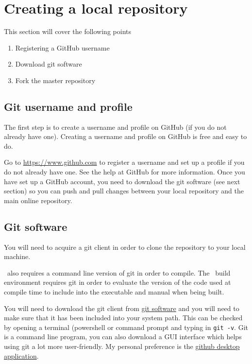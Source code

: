 \section{Creating a local repository\label{sec:local_repo}}

This section will cover the following points

\begin{enumerate}
	\item Registering a GitHub username
	\item Download git software
	\item Fork the master repository
\end{enumerate}

\subsection{Git username and profile}

The first step is to create a username and profile on GitHub (if you do not already have one). Creating a username and profile on GitHub is free and easy to do. 

Go to \url{https://www.github.com} to register a username and set up a profile if you do not already have one. See the help at GitHub for more information. Once you have set up a GitHub account, you need to download the git software (see next section) so you can push and pull changes between your local repository and the main online repository.

\subsection{Git software}

You will need to acquire a git client in order to clone the repository to your local machine.

\CNAME\ also requires a command line version of git in order to compile. The \CNAME\ build environment requires git in order to evaluate the version of the code used at compile time to include into the executable and manual when being built. 

You will need to download the git client from \href{https://git-scm.com/downloads}{git software} and you will need to make sure that it has been included into your system path. This can be checked by opening a terminal (powershell or command prompt and typing in \texttt{git -v}. Git is a command line program, you can also download a GUI interface which helps using git a lot more user-friendly. My personal preference is the \href{https://desktop.github.com/}{github desktop application}. 

